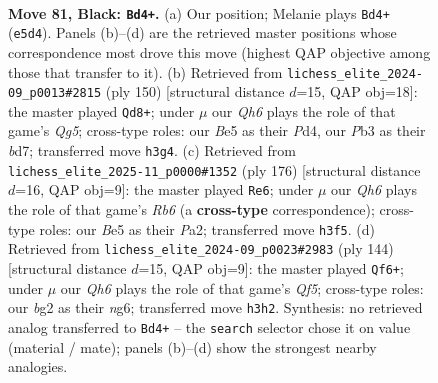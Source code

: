 \documentclass[11pt]{article}
\begin{document}
\clearpage

\begin{figure}[p]\centering
\begin{subfigure}{0.46\textwidth}\centering
\resizebox{\linewidth}{!}{%
\newchessgame
\chessboard[
  setfen={8/8/8/4b3/8/1p5q/3k2B1/6K1 b - - 5 81},
  showmover=false,
  pgfstyle=straightmove, color=movearrow, markmove={e5-d4}
]}
\caption{}
\end{subfigure}\hfill
\begin{subfigure}{0.46\textwidth}\centering
\resizebox{\linewidth}{!}{%
\newchessgame
\chessboard[
  setfen={7k/3b2r1/8/6Q1/3PK3/8/8/8 w - - 9 76},
  showmover=false,
  pgfstyle=straightmove, color=movearrow, markmove={g5-d8}
]}
\caption{}
\end{subfigure}
\\[4pt]
\begin{subfigure}{0.46\textwidth}\centering
\resizebox{\linewidth}{!}{%
\newchessgame
\chessboard[
  setfen={8/8/1R6/pbk5/8/8/PK6/8 w - - 8 89},
  showmover=false,
  pgfstyle=straightmove, color=movearrow, markmove={b6-e6}
]}
\caption{}
\end{subfigure}\hfill
\begin{subfigure}{0.46\textwidth}\centering
\resizebox{\linewidth}{!}{%
\newchessgame
\chessboard[
  setfen={8/6k1/6n1/5QP1/8/8/8/6K1 w - - 1 73},
  showmover=false,
  pgfstyle=straightmove, color=movearrow, markmove={f5-f6}
]}
\caption{}
\end{subfigure}
\caption{\textbf{Move 81, Black: \texttt{Bd4+}.} (a) Our position; Melanie plays \texttt{Bd4+} (\texttt{e5d4}). Panels (b)--(d) are the retrieved master positions whose correspondence most drove this move (highest QAP objective among those that transfer to it). (b) Retrieved from \texttt{lichess\_elite\_2024-09\_p0013\#2815} (ply 150) [structural distance $d$=15, QAP obj=18]: the master played \texttt{Qd8+}; under $\mu$ our \emph{Qh6} plays the role of that game's \emph{Qg5}; cross-type roles: our \emph{B}e5 as their \emph{P}d4, our \emph{P}b3 as their \emph{b}d7; transferred move \texttt{h3g4}. (c) Retrieved from \texttt{lichess\_elite\_2025-11\_p0000\#1352} (ply 176) [structural distance $d$=16, QAP obj=9]: the master played \texttt{Re6}; under $\mu$ our \emph{Qh6} plays the role of that game's \emph{Rb6} (a \textbf{cross-type} correspondence); cross-type roles: our \emph{B}e5 as their \emph{P}a2; transferred move \texttt{h3f5}. (d) Retrieved from \texttt{lichess\_elite\_2024-09\_p0023\#2983} (ply 144) [structural distance $d$=15, QAP obj=9]: the master played \texttt{Qf6+}; under $\mu$ our \emph{Qh6} plays the role of that game's \emph{Qf5}; cross-type roles: our \emph{b}g2 as their \emph{n}g6; transferred move \texttt{h3h2}. Synthesis: no retrieved analog transferred to \texttt{Bd4+} -- the \texttt{search} selector chose it on value (material / mate); panels (b)--(d) show the strongest nearby analogies.}
\label{fig:thought-m161}
\end{figure}
\end{document}
